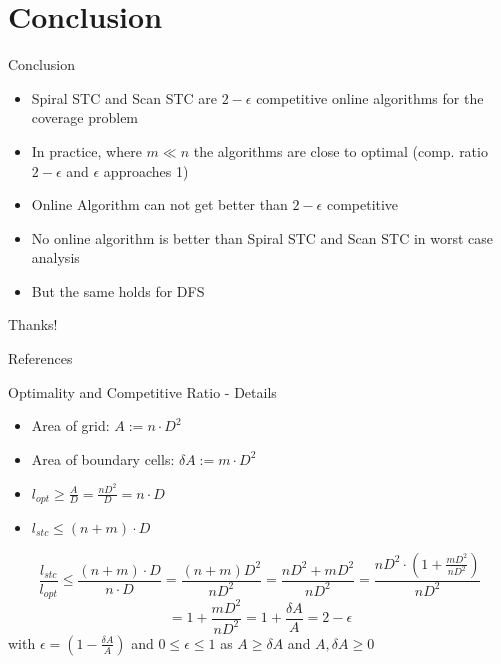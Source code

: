\documentclass{beamer}
\begin{document}
\section{Conclusion}
\begin{frame}{Conclusion}
    \begin{itemize}
        \item Spiral STC and Scan STC are $2 - \epsilon$ competitive online algorithms for the coverage problem
        \item In practice, where $m \ll n$ the algorithms are close to optimal (comp. ratio $2 - \epsilon$ and $\epsilon$ approaches 1)
        \item Online Algorithm can not get better than $2 - \epsilon$ competitive
        \item No online algorithm is better than Spiral STC and Scan STC in worst case analysis
        \item But the same holds for DFS
    \end{itemize}
\end{frame}

\begin{frame}[focus]
    Thanks!
\end{frame}


\appendix

\begin{frame}{References}
    \nocite{*} %
    
    
\end{frame}

\begin{frame}{Optimality and Competitive Ratio - Details}
    \begin{itemize}
        \item Area of grid: $A := n \cdot D^2$
        \item Area of boundary cells: $\delta A := m \cdot D^2$
        \item $l_{opt} \geq \frac{A}{D} = \frac{nD^2}{D} = n \cdot D$
        \item $l_{stc} \leq (n + m) \cdot D$
    \end{itemize}

    $$ \frac{l_{stc}}{l_{opt}} \leq \frac{(n+m) \cdot D}{n \cdot D} = \frac{(n + m) D^2}{n D^2} = \frac{nD^2 + mD^2}{nD^2} = \frac{nD^2 \cdot (1 + \frac{mD^2}{nD^2})}{nD^2}$$
    $$= 1 + \frac{mD^2}{nD^2} = 1 + \frac{\delta A}{A} = 2 - \epsilon$$
    with $\epsilon = (1 - \frac{\delta A}{A})$ and $0 \leq \epsilon \leq 1$ as $A \geq \delta A$ and $A, \delta A \geq 0$
\end{frame}
\end{document}
